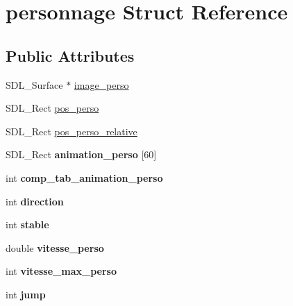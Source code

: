 \hypertarget{structpersonnage}{}\section{personnage Struct Reference}
\label{structpersonnage}
\subsection*{Public Attributes}
\begin{DoxyCompactItemize}
\item 
S\+D\+L\+\_\+\+Surface $\ast$ \hyperlink{structpersonnage_a791093b3684860157a3c156fe8bed344}{image\+\_\+perso}
\item 
S\+D\+L\+\_\+\+Rect \hyperlink{structpersonnage_ae463b597df9edc784f3d4e0ec1e4cb01}{pos\+\_\+perso}
\item 
S\+D\+L\+\_\+\+Rect \hyperlink{structpersonnage_af5e96572fb204c5b7b8f8c65df786c11}{pos\+\_\+perso\+\_\+relative}
\item 
\mbox{\label{structpersonnage_a0ff04a353ae7233e1fc31f429e13fe36}} 
S\+D\+L\+\_\+\+Rect {\bfseries animation\+\_\+perso} \mbox{[}60\mbox{]}
\item 
\mbox{\label{structpersonnage_a9be8353e105d1be0e4c8dd631d167b64}} 
int {\bfseries comp\+\_\+tab\+\_\+animation\+\_\+perso}
\item 
\mbox{\label{structpersonnage_a2664acffa6fccd8487b9e03b63fbd6da}} 
int {\bfseries direction}
\item 
\mbox{\label{structpersonnage_a00f1b2301bdad28928de686202b50b07}} 
int {\bfseries stable}
\item 
\mbox{\label{structpersonnage_a9cd9c9d66ebbb0faa4bdc9fd33230745}} 
double {\bfseries vitesse\+\_\+perso}
\item 
\mbox{\label{structpersonnage_afc0036b6619708ecb3239440c72383db}} 
int {\bfseries vitesse\+\_\+max\+\_\+perso}
\item 
\mbox{\label{structpersonnage_aa24491ca75878266706694b29b841691}} 
int {\bfseries jump}
\item 
\mbox{\label{structpersonnage_ad5c01f326fc913ef80791f84489c4c01}} 

\end{DoxyCompactItemize}
